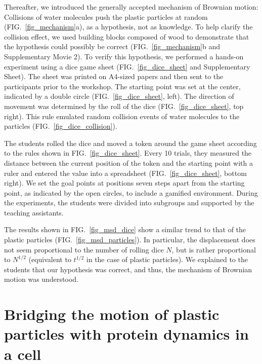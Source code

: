 \documentclass[10pt, aps, prb, preprint, longbibliography, superscriptaddress]{revtex4-2}
\newcommand{\figref}[1]{FIG.~\ref{#1}}
\begin{document}
Thereafter, we introduced the generally accepted mechanism of Brownian motion:
Collisions of water molecules push the plastic particles at random (\figref{fig_mechanism}a),
as a hypothesis, not as knowledge.
To help clarify the collision effect, we used building blocks composed of wood to demonstrate that
the hypothesis could possibly be correct (\figref{fig_mechanism}b and Supplementary Movie 2).
To verify this hypothesis, we performed a hands-on experiment
using a dice game sheet\cite{oosawa_hand} (\figref{fig_dice_sheet} and Supplementary Sheet).
The sheet was printed on A4-sized papers and then sent to the participants prior to the workshop.
The starting point was set at the center, indicated by a double circle (\figref{fig_dice_sheet}, left).
The direction of movement was determined by the roll of the dice (\figref{fig_dice_sheet}, top right).
This rule emulated random collision events of water molecules to the particles (\figref{fig_dice_collision}).

The students rolled the dice and moved a token around the game sheet
according to the rules shown in \figref{fig_dice_sheet}.
Every 10 trials, they measured the distance between the current position of the token
and the starting point with a ruler and entered the value into a spreadsheet (\figref{fig_dice_sheet}, bottom right).
We set the goal points at positions seven steps apart from the starting point,
as indicated by the open circles, to include a gamified environment.
During the experiments, the students were divided into subgroups and supported by the teaching assistants.

The results shown in \figref{fig_msd_dice} show a similar trend to
that of the plastic particles (\figref{fig_msd_particles}).
In particular, the displacement does not seem proportional to the number of rolling dice $N$,
but is rather proportional to $N^{1/2}$ (equivalent to $t^{1/2}$ in the case of plastic particles).
We explained to the students that our hypothesis was correct,
and thus, the mechanism of Brownian motion was understood.



\section{Bridging the motion of plastic particles with protein dynamics in a cell}
\label{sec:bridging}
\end{document}
